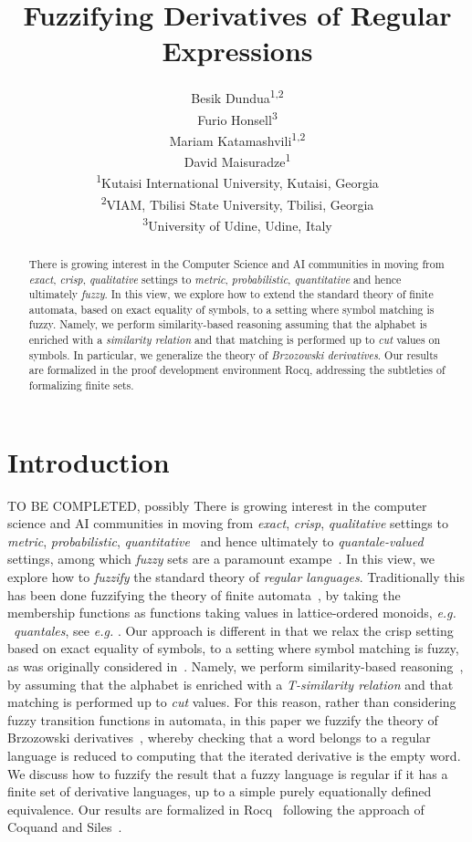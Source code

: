 \documentclass{article}
\title{Fuzzifying Derivatives of Regular Expressions}
\author{
Besik Dundua\textsuperscript{1,2}\\
Furio Honsell\textsuperscript{3}\\
Mariam Katamashvili\textsuperscript{1,2}\\
David Maisuradze\textsuperscript{1}\\[0.75em]
\small \textsuperscript{1}Kutaisi International University, Kutaisi, Georgia\\
\small \textsuperscript{2}VIAM, Tbilisi State University, Tbilisi, Georgia\\
\small \textsuperscript{3}University of Udine, Udine, Italy
}
\date{}
\def\eg{{\em e.g. }}
\begin{document}
\maketitle
\begin{abstract} There is growing interest in the Computer Science and AI communities in moving from {\em exact}, {\em crisp}, {\em qualitative} settings to {\em metric}, {\em probabilistic}, {\em quantitative} and hence ultimately {\em fuzzy}. In this view, we explore how to extend the standard theory of finite automata, based on exact equality of symbols, to a setting where symbol matching is fuzzy. Namely, we perform similarity-based reasoning 
assuming that the alphabet is enriched with a {\em similarity relation}
and that matching is performed up to {\em cut} values on symbols. In particular, we generalize the theory of
{\em Brzozowski derivatives}. Our results are formalized in the proof development environment Rocq, addressing the subtleties of formalizing finite sets.

\end{abstract}
\section{Introduction} {\color{red} TO BE COMPLETED, possibly}
There is growing interest in the computer science and AI communities in moving from {\em exact}, {\em crisp}, {\em qualitative} settings to {\em metric}, {\em probabilistic}, {\em quantitative}~\cite{AlvesKesnerRamos2025,SilvaBonchiBonsangueRutten2011} and hence ultimately to {\em quantale-valued} settings, among which {\em fuzzy} sets are a paramount exampe~\cite{met05}. In this view, we explore how to {\em fuzzify} the standard theory of {\em regular languages}. Traditionally this has been done fuzzifying the theory of finite automata~\cite{C71}, by taking the membership functions as  functions taking values in lattice-ordered monoids, \eg\ {\em quantales}, see \eg\cite{LP06}. Our approach is different in that we relax the crisp setting based on exact equality of symbols, to a setting where symbol matching is fuzzy, as was originally considered in~\cite{Santos68,WeeFu69}. Namely, we perform similarity-based reasoning~\cite{Sessa2002},
by assuming that the alphabet is enriched with a {\em T-similarity relation}
and that matching is performed up to {\em cut} values. 
For this reason, rather than considering fuzzy transition functions in automata, in this paper we fuzzify the theory of
Brzozowski derivatives~\cite{B64,OwensReppyTuron}, whereby checking that a word belongs to a regular language is reduced to computing that the iterated derivative is the empty word. We discuss how to fuzzify the result that a fuzzy  language is regular if it has a finite set of derivative languages, up to a simple purely equationally defined  equivalence. %
Our results are formalized in Rocq~\cite{Rocq} following the approach of Coquand and Siles~\cite{CoquandRegexEquality}. 
\end{document}

